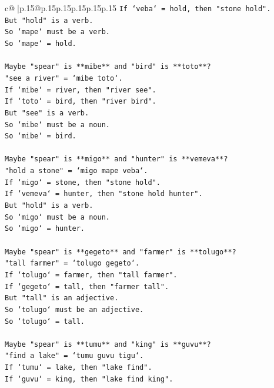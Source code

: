 \documentclass{article}
\begin{document}
{\begin{supertabular}{c@{$\;$}|p{.15\linewidth}@{}p{.15\linewidth}p{.15\linewidth}p{.15\linewidth}p{.15\linewidth}p{.15\linewidth}}
{{{\texttt{If `veba` = hold, then "stone hold".} \\
\texttt{But "hold" is a verb.} \\
\texttt{So `mape` must be a verb.} \\
\texttt{So `mape` = hold.} \\
\\ 
\texttt{Maybe "spear" is **mibe** and "bird" is **toto**?} \\
\texttt{"see a river" = `mibe toto`.} \\
\texttt{If `mibe` = river, then "river see".} \\
\texttt{If `toto` = bird, then "river bird".} \\
\texttt{But "see" is a verb.} \\
\texttt{So `mibe` must be a noun.} \\
\texttt{So `mibe` = bird.} \\
\\ 
\texttt{Maybe "spear" is **migo** and "hunter" is **vemeva**?} \\
\texttt{"hold a stone" = `migo mape veba`.} \\
\texttt{If `migo` = stone, then "stone hold".} \\
\texttt{If `vemeva` = hunter, then "stone hold hunter".} \\
\texttt{But "hold" is a verb.} \\
\texttt{So `migo` must be a noun.} \\
\texttt{So `migo` = hunter.} \\
\\ 
\texttt{Maybe "spear" is **gegeto** and "farmer" is **tolugo**?} \\
\texttt{"tall farmer" = `tolugo gegeto`.} \\
\texttt{If `tolugo` = farmer, then "tall farmer".} \\
\texttt{If `gegeto` = tall, then "farmer tall".} \\
\texttt{But "tall" is an adjective.} \\
\texttt{So `tolugo` must be an adjective.} \\
\texttt{So `tolugo` = tall.} \\
\\ 
\texttt{Maybe "spear" is **tumu** and "king" is **guvu**?} \\
\texttt{"find a lake" = `tumu guvu tigu`.} \\
\texttt{If `tumu` = lake, then "lake find".} \\
\texttt{If `guvu` = king, then "lake find king".} \\
}}}
\end{supertabular}}
\end{document}
